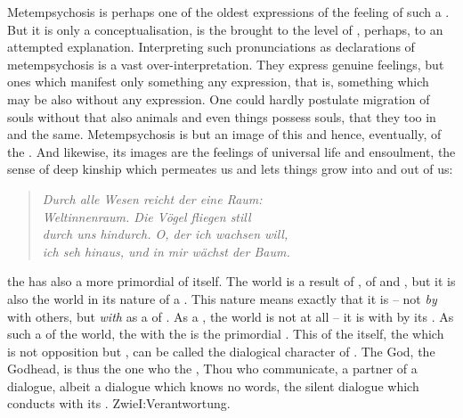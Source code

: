 Metempsychosis is perhaps one of the oldest expressions of the feeling of such a
. But it is only a conceptualisation, is the
 brought to the level of , perhaps, to
an attempted explanation.  Interpreting such pronunciations as declarations of
metempsychosis is a vast over-interpretation. They express genuine feelings, but
ones which manifest only something  any expression,
that is, something which may be  also without any expression. One
could hardly postulate migration of souls without 
that also animals and even things possess souls, that they too 
in  and the same. Metempsychosis is but
an image of this  and hence, eventually, of the . And likewise, its images are the feelings of universal life and
ensoulment, 
the sense of deep kinship 
which permeates us and lets things grow into and out of us:
\begin{verse}
{\small{\em Durch alle Wesen reicht der eine Raum:\\
Weltinnenraum. Die V\"{o}gel fliegen still\\
durch uns hindurch. O, der ich wachsen will,\\
ich seh hinaus, und in mir w\"{a}chst der Baum.~
}}\end{verse}  
%
 the  has also a more primordial  of
 itself.  The {world} is a result of , of
 and , but it is also the world
 in its nature of a .  This nature means exactly that it is
 -- not {\em by}  with others, but {\em with}  as a
 of . As a , the world is not  at
all -- it is  with  by its .  As such a 
of the world, the  with the  is the primordial
.  This  of the  itself, the
  which is not opposition but ,
can be called the dialogical character of .  The 
God, the  Godhead, is thus the one who  the ,
Thou who communicate, a partner of a dialogue, albeit a dialogue which knows no
words, the silent dialogue which  conducts with its .
\citet{Every concrete hour which, with its world content and destiny, is
  allotted to a person, is a noteworthy language.}{Zwie}{I:Verantwortung.
  }

